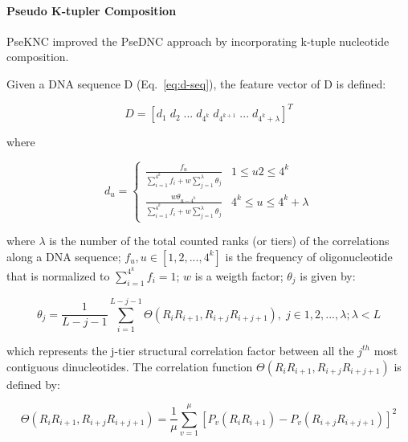 \paragraph{Pseudo K-tupler Composition}


\gls{PseKNC} improved the \gls{PseDNC} approach by incorporating k-tuple nucleotide composition.

Given a DNA sequence D (Eq.~\ref{eq:d-seq}), the feature vector of D is defined:

\begin{equation}\label{eq:PseKNC-feature-vector}
    D = [d_{1}\;d_{2}\;...\;d_{4^{k}}\;d_{4^{k+1}}\;...\;d_{4^{k} + \lambda}]^{T}
\end{equation}

where

\begin{equation}\label{eq:PseKNC-du}
    d_{u} = 
    \begin{cases}
        \frac{f_{u}}{\sum_{i=1}^{4^{k}} f_{i} + w\sum_{j=1}^{\lambda}\theta_{j}} & 1 \le u2 \le 4^{k}
    \\
        \frac{w\theta_{u-4^{k}}}{\sum_{i=1}^{4^{k}} f_{i} + w\sum_{j=1}^{\lambda}\theta_{j}} & 4^{k} \le u \le 4^{k} + \lambda
    
    \end{cases}
\end{equation}

where $\lambda$ is the number of the total counted ranks (or tiers) of the correlations along a DNA sequence; $f_{u}, u\in[1,2,...,4^{k}]$ is the frequency of oligonucleotide that is normalized to $\sum_{i=1}^{4^{k}}f_{i} = 1$; $w$ is a weigth factor; $\theta_{j}$ is given by:

\begin{equation}\label{eq:PseKNC-thetas}
\theta_{j} = \frac{1}{L-j-1} \sum_{i=1}^{L-j-1}\Theta(R_{i}R_{i+1}, R_{i+j}R_{i+j+1}), \;j\in{1,2,...,\lambda;\lambda < L}
\end{equation}

which represents the j-tier structural correlation factor between all the $j^{th}$ most
contiguous dinucleotides. The correlation function $\Theta(R_{i}R_{i+1}, R_{i+j}R_{i+j+1})$ is defined by:

\begin{equation}\label{eq:PseKNC-correlation}
    \Theta(R_{i}R_{i+1}, R_{i+j}R_{i+j+1}) = \frac{1}{\mu}\sum_{v=1}^{\mu}[P_{v} (R_{i}R_{i+1}) - P_{v}(R_{i+j}R_{i+j+1})]^{2}
\end{equation}

